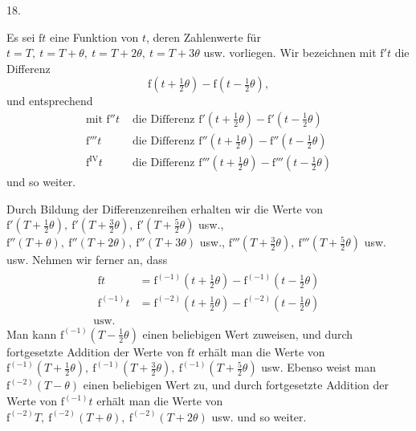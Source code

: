\par\begingroup
\setlength{\lineskip}{4pt}\setlength{\lineskiplimit}{4pt}
\bigskip
{}
\begin{center}18.\end{center}
\noindent\hspace*{\parindent}Es sei \(\mathrm{f}t\) eine Funktion von \(t\), deren Zahlenwerte für \(t=T,\ t=T+\theta,\ t=T+2\theta,\ t=T+3\theta\) usw. vorliegen. Wir bezeichnen mit \(\mathrm{f}'t\) die Differenz
\[
\mathrm{f}(t+\tfrac12\theta)-\mathrm{f}(t-\tfrac12\theta),
\]
und entsprechend
\[
\begin{aligned}
\text{mit }\mathrm{f}''t&\text{ die Differenz }\mathrm{f}'(t+\tfrac12\theta)-\mathrm{f}'(t-\tfrac12\theta)\\
\mathrm{f}'''t&\text{ die Differenz }\mathrm{f}''(t+\tfrac12\theta)-\mathrm{f}''(t-\tfrac12\theta)\\
\mathrm{f}^{\mathrm{IV}}t&\text{ die Differenz }\mathrm{f}'''(t+\tfrac12\theta)-\mathrm{f}'''(t-\tfrac12\theta)
\end{aligned}
\]
und so weiter.
\par Durch Bildung der Differenzenreihen erhalten wir die Werte von \(\mathrm{f}'(T+\tfrac12\theta),\ \mathrm{f}'(T+\tfrac32\theta),\ \mathrm{f}'(T+\tfrac52\theta)\) usw., \(\mathrm{f}''(T+\theta),\ \mathrm{f}''(T+2\theta),\ \mathrm{f}''(T+3\theta)\) usw., \(\mathrm{f}'''(T+\tfrac32\theta),\ \mathrm{f}'''(T+\tfrac52\theta)\) usw. usw. Nehmen wir ferner an, dass
\[
\begin{gathered}
\begin{aligned}
\mathrm{f}t&=\mathrm{f}^{(-1)}(t+\tfrac12\theta)-\mathrm{f}^{(-1)}(t-\tfrac12\theta)\\
\mathrm{f}^{(-1)}t&=\mathrm{f}^{(-2)}(t+\tfrac12\theta)-\mathrm{f}^{(-2)}(t-\tfrac12\theta)
\end{aligned}\\
\text{usw.}
\end{gathered}
\]
Man kann \(\mathrm{f}^{(-1)}(T-\tfrac12\theta)\) einen beliebigen Wert zuweisen, und durch fortgesetzte Addition der Werte von \(\mathrm{f}t\) erhält man die Werte von \(\mathrm{f}^{(-1)}(T+\tfrac12\theta),\ \mathrm{f}^{(-1)}(T+\tfrac32\theta),\ \mathrm{f}^{(-1)}(T+\tfrac52\theta)\) usw. Ebenso weist man \(\mathrm{f}^{(-2)}(T-\theta)\) einen beliebigen Wert zu, und durch fortgesetzte Addition der Werte von \(\mathrm{f}^{(-1)}t\) erhält man die Werte von \(\mathrm{f}^{(-2)}T,\ \mathrm{f}^{(-2)}(T+\theta),\ \mathrm{f}^{(-2)}(T+2\theta)\) usw. und so weiter.
